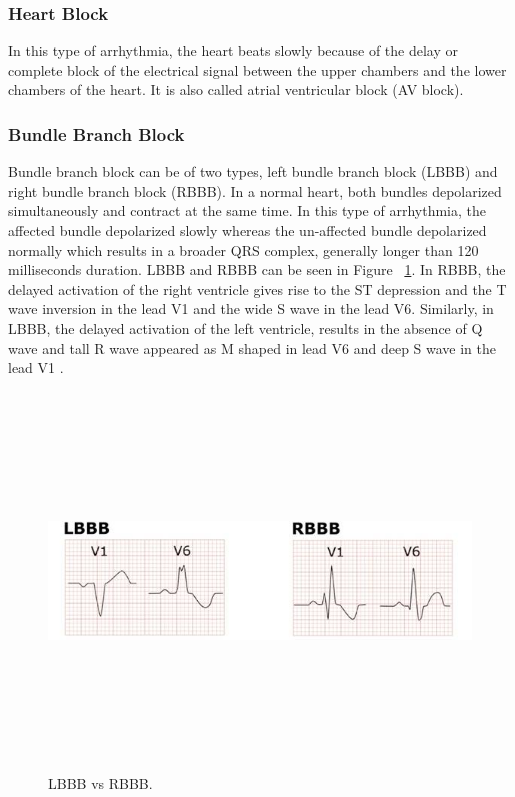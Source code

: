 \subsubsection{Heart Block}
In this type of arrhythmia, the heart beats slowly because of the delay or complete block of the electrical signal between the upper chambers and the lower chambers of the heart. It is also called atrial ventricular block (AV block).

\subsubsection{Bundle Branch Block}
Bundle branch block can be of two types, left bundle branch block (LBBB) and right bundle branch block (RBBB). In a normal heart, both bundles depolarized simultaneously and contract at the same time. In this type of arrhythmia, the affected bundle depolarized slowly whereas the un-affected bundle depolarized normally which results in a broader QRS complex, generally longer than 120 milliseconds duration. LBBB and RBBB can be seen in Figure ~\ref{fig:LRBBB}. In RBBB, the delayed activation of the right ventricle gives rise to the ST depression and the T wave inversion in the lead V1 and the wide S wave in the lead V6. Similarly, in LBBB, the delayed activation of the left ventricle, results in the absence of Q wave and tall R wave appeared as M shaped in lead V6 and deep S wave in the lead V1 \cite{cablesandsensors}.


\begin{figure}[htpb]
	\centering
	\includegraphics[width=12cm,height=10cm,keepaspectratio=true]{images/LRBBB}
	\caption{
		LBBB vs RBBB\cite{bilagi}.
	}
	\label{fig:LRBBB}
\end{figure}